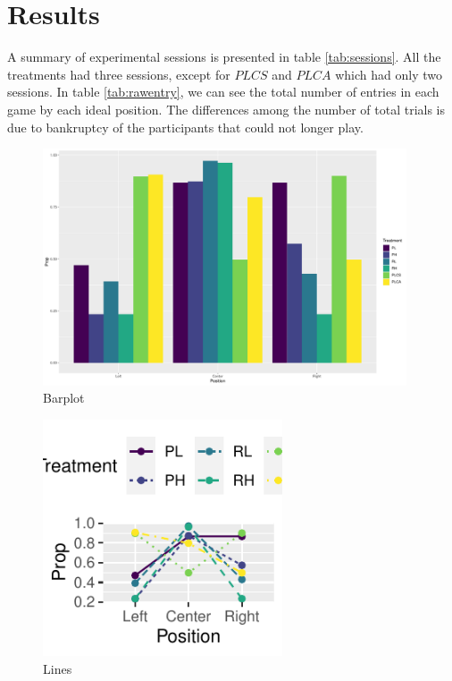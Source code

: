 \section{Results}



A summary of experimental sessions is presented in table \ref{tab:sessions}. All the treatments had three sessions, except for $PLCS$ and $PLCA$ which had only two sessions. In table \ref{tab:rawentry},  we can see the total number of entries in each game by each ideal position. The differences among the number of total trials is due to bankruptcy of the participants that could not longer play.



\begin{figure}
	\includegraphics[width=1\linewidth, height=7cm]{../../results/figures/barplot_prop} 
	\caption{Barplot}
	\label{fig:barplot}
\end{figure}

\begin{figure}
	\includegraphics[width=1\linewidth, height=7cm]{../../results/figures/lines_prop} 
	\caption{Lines}
	\label{fig:lines}
\end{figure}


